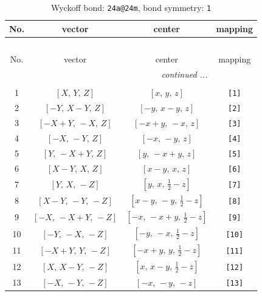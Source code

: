 \documentclass[fleqn,8pt]{jsarticle}
\begin{document}
\begin{longtable}{cccc}
\caption{Wyckoff bond: {\tt 24a@24m}, bond symmetry: {\tt 1}}
 \\
 \hline \hline
No. & vector & center & mapping \\ \hline \endfirsthead

\multicolumn{3}{l}{\tablename\ \thetable{}} \\
 \hline \hline
No. & vector & center & mapping \\ \hline \endhead

 \hline \hline
\multicolumn{3}{r}{\footnotesize\it continued ...} \\ \endfoot

 \hline \hline
\multicolumn{3}{r}{} \\ \endlastfoot

1 & $\left[ X,\, Y,\, Z \right]$ & $\left[ x,\, y,\, z \right]$ & {\tt [1]} \\ \hline
2 & $\left[ - Y,\, X - Y,\, Z \right]$ & $\left[ - y,\, x - y,\, z \right]$ & {\tt [2]} \\ \hline
3 & $\left[ - X + Y,\, - X,\, Z \right]$ & $\left[ - x + y,\, - x,\, z \right]$ & {\tt [3]} \\ \hline
4 & $\left[ - X,\, - Y,\, Z \right]$ & $\left[ - x,\, - y,\, z \right]$ & {\tt [4]} \\ \hline
5 & $\left[ Y,\, - X + Y,\, Z \right]$ & $\left[ y,\, - x + y,\, z \right]$ & {\tt [5]} \\ \hline
6 & $\left[ X - Y,\, X,\, Z \right]$ & $\left[ x - y,\, x,\, z \right]$ & {\tt [6]} \\ \hline
7 & $\left[ Y,\, X,\, - Z \right]$ & $\left[ y,\, x,\, \frac{1}{2} - z \right]$ & {\tt [7]} \\ \hline
8 & $\left[ X - Y,\, - Y,\, - Z \right]$ & $\left[ x - y,\, - y,\, \frac{1}{2} - z \right]$ & {\tt [8]} \\ \hline
9 & $\left[ - X,\, - X + Y,\, - Z \right]$ & $\left[ - x,\, - x + y,\, \frac{1}{2} - z \right]$ & {\tt [9]} \\ \hline
10 & $\left[ - Y,\, - X,\, - Z \right]$ & $\left[ - y,\, - x,\, \frac{1}{2} - z \right]$ & {\tt [10]} \\ \hline
11 & $\left[ - X + Y,\, Y,\, - Z \right]$ & $\left[ - x + y,\, y,\, \frac{1}{2} - z \right]$ & {\tt [11]} \\ \hline
12 & $\left[ X,\, X - Y,\, - Z \right]$ & $\left[ x,\, x - y,\, \frac{1}{2} - z \right]$ & {\tt [12]} \\ \hline
13 & $\left[ - X,\, - Y,\, - Z \right]$ & $\left[ - x,\, - y,\, - z \right]$ & {\tt [13]} \\ \hline

\end{longtable}
\end{document}

